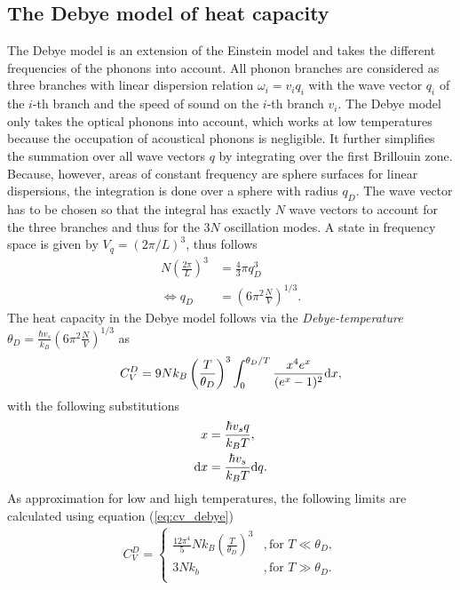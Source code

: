 \subsection{The Debye model of heat capacity}
\label{sec:debye}

The Debye model is an extension of the Einstein model and takes the different frequencies of the phonons into account.
All phonon branches are considered as three branches with linear dispersion relation $\omega_i = v_i q_i$ with the wave vector $q_i$ of the $i$-th branch and the speed of sound on the $i$-th branch $v_i$.
The Debye model only takes the optical phonons into account, which works at low temperatures because the occupation of acoustical phonons is negligible.
It further simplifies the summation over all wave vectors $q$ by integrating over the first Brillouin zone.
Because, however, areas of constant frequency are sphere surfaces for linear dispersions, the integration is done over a sphere with radius $q_D$.
The wave vector has to be chosen so that the integral has exactly $N$ wave vectors to account for the three branches and thus for the $3N$ oscillation modes.
A state in frequency space is given by $V_q = (2\pi/L)^3$, thus follows
\begin{align}
    N\left(\frac{2\pi}{L}\right)^3 &= \frac 43\pi q_D^3 \\
    \iff q_D &= \left(6\pi^2\frac NV\right)^{1/3}.
    \label{eq:q_D}
\end{align}
The heat capacity in the Debye model follows via the \textit{Debye-temperature} $\theta_D=\frac{\hbar v_s}{k_B}\left(6\pi^2\frac NV\right)^{1/3}$ as
\begin{align}
    C_V^D=9Nk_B\left(\frac{T}{\theta_D}\right)^3\int_0^{\theta_D/T}\frac{x^4e^x}{(e^x-1)^2}\text dx,
    \label{eq:cv_debye}
\end{align}
with the following substitutions
\begin{align}
    \label{eq:substitution_x}
    x &= \frac{\hbar v_s q}{k_BT}, \\
    \text dx &= \frac{\hbar v_s}{k_BT}\text dq.
    \label{eq:substitution_dx}
\end{align}
As approximation for low and high temperatures, the following limits are calculated using equation (\ref{eq:cv_debye})
\begin{align}
    C_V^D=\begin{cases}
        \frac{12\pi^4}{5}Nk_B\left(\frac{T}{\theta_D} \right)^3 &,\text{for }T\ll\theta_D, \\
        3Nk_b &,\text{for }T\gg\theta_D. \\
        \end{cases}
    \label{eq:cv_debye_final}
\end{align}
